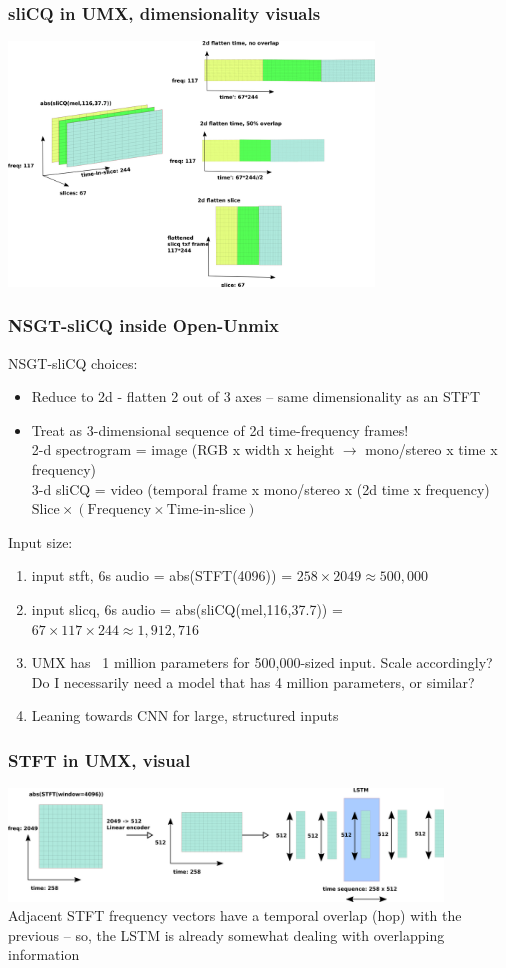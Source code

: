 \documentclass[usenames,dvipsnames]{beamer}
\begin{document}
\begin{frame}
	\frametitle{sliCQ in UMX, dimensionality visuals}
	\includegraphics[height=6.5cm]{./umxslicqdimred.png}
\end{frame}

\begin{frame}
	\frametitle{NSGT-sliCQ inside Open-Unmix}
	NSGT-sliCQ choices:
	\begin{itemize}
		\item
			Reduce to 2d - flatten 2 out of 3 axes -- same dimensionality as an STFT
		\item
			Treat as 3-dimensional sequence of 2d time-frequency frames!\\
			2-d spectrogram = image (RGB x width x height $\rightarrow$ mono/stereo x time x frequency)\\
			3-d sliCQ = video (temporal frame x mono/stereo x (2d time x frequency)\\
			$\text{Slice} \times (\text{Frequency} \times \text{Time-in-slice})$
	\end{itemize}
	Input size:
	\begin{enumerate}
		\item
			input stft, 6s audio = abs(STFT(4096)) = $258 \times 2049 \approx 500,000$
		\item
			input slicq, 6s audio = abs(sliCQ(mel,116,37.7)) = $67 \times 117 \times 244 \approx 1,912,716$
		\item
			UMX has ~1 million parameters for 500,000-sized input. Scale accordingly? Do I necessarily need a model that has 4 million parameters, or similar?
		\item
			Leaning towards CNN for large, structured inputs
	\end{enumerate}
\end{frame}

\begin{frame}
	\frametitle{STFT in UMX, visual}
	\includegraphics[height=3cm]{./umxstftlstm.png}\\
	Adjacent STFT frequency vectors have a temporal overlap (hop) with the previous -- so, the LSTM is already somewhat dealing with overlapping information
\end{frame}
\end{document}
